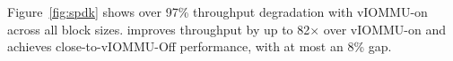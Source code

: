 Figure~\ref{fig:spdk} shows over 97\% throughput degradation 
    with vIOMMU-on across all block sizes.
\brand improves throughput by up to 82$\times$ over vIOMMU-on and 
    achieves close-to-vIOMMU-Off performance, with at most an 8\% gap.


    


